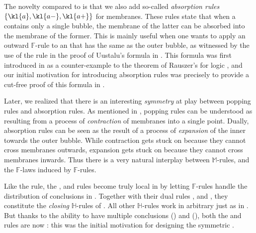 \begin{description}
  The novelty compared to  is that we also add so-called
  \emph{absorption rules} $\{\kl{a},\kl{a{-}},\kl{a{+}}\}$ for membranes.
  These rules state that when a  contains only a single  bubble,
  the membrane of the latter can be absorbed into the membrane of the former.
  This is mainly useful when one wants to apply an outward $\mathbb{F}$-rule to
  an  that has the same  as the outer bubble, as witnessed by the
  use of the  rule in the proof of Uustalu's formula in
  . This formula was first introduced in
   as a counter-example to the 
  theorem of Rauszer's  for  logic
  , and our initial motivation for
  introducing absorption rules was precisely to provide a cut-free proof of this
  formula in .

  Later, we realized that there is an interesting \emph{symmetry} at play
  between popping rules and absorption rules. As mentioned in
  , popping rules can be understood as resulting from a
  process of \emph{contraction} of membranes into a single point. Dually,
  absorption rules can be seen as the result of a process of \emph{expansion} of
  the inner  towards the outer bubble. While contraction gets stuck on
    because they cannot cross  membranes outwards,
  expansion gets stuck on   because they cannot cross 
  membranes inwards. Thus there is a very natural interplay between
  $\mathbb{M}$-rules, and the $\mathbb{F}$-laws induced by $\mathbb{F}$-rules.

  \item[\textbf{\heating}] 
  Like the  rule, the \kl{\bot{-}}, \kl{\lor{-}} and
  \kl{{\limp}{-}} rules become truly local in  by letting
  $\mathbb{F}$-rules handle the distribution of conclusions in .
  Together with their dual rules \kl{\top{+}}, \kl{\land{+}} and
  \kl{{\limp}{+}}, they constitute the \emph{closing} $\mathbb{H}$-rules of
  . All other $\mathbb{H}$-rules work in arbitrary  just
  as in . But thanks to the ability to have multiple conclusions
  () and   (), both the
  \kl{\lor{+}} and \kl{{\limp}{+}} rules are now \emph{}: this was
  the initial motivation for designing the symmetric .
\end{description}